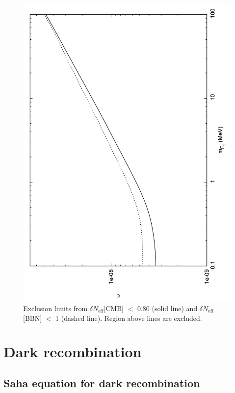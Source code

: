 \documentclass[12pt]{article}
\begin{document}
\begin{figure}[htpb]
    \centering
        \includegraphics[scale=0.5, angle=270]{fig5}
    \caption{Exclusion limits from $\delta N _{\text{eff}}$[CMB] $<$
0.80 (solid line) and $\delta N _{\text{eff}}$[BBN] $<$ 1 (dashed line).
Region above lines are excluded.}
    \label{fig:Comparison bbn cmb}
\end{figure}
%

\newpage

\section{Dark recombination}

\subsection{Saha equation for dark recombination}
\end{document}
